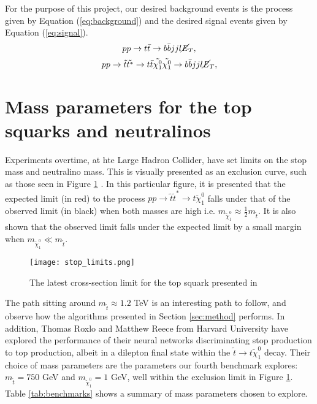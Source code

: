 For the purpose of this project, our desired background events is the process given by Equation (\ref{eq:background}) and the desired signal events given by Equation (\ref{eq:signal}). \\

\begin{equation}
 pp \rightarrow t \Bar{t} \rightarrow b\Bar{b}jjl\cancel{\it{E}}_{T},
 \label{eq:background}
\end{equation}
\begin{equation}
  pp \rightarrow \Tilde{t}\Tilde{t^*} \rightarrow t \Bar{t} \Tilde{\chi^0_1}\Tilde{\chi^0_1} \rightarrow b\Bar{b}jjl\cancel{\it{E}}_{T},
  \label{eq:signal}
\end{equation}

\section{Mass parameters for the top squarks and neutralinos}
Experiments overtime, at hte Large Hadron Collider, have set limits on the stop mass and neutralino mass. This is visually presented as an exclusion curve, such as those seen in Figure \ref{fig:limits} \cite{cms2019search}. In this particular figure, it is presented that the expected limit (in red) to the process $pp \rightarrow \tilde{t}\tilde{t}^* \rightarrow t\tilde{\chi}_1^0$ falls under that of the observed limit (in black) when both masses are high i.e. $m_{\tilde{\chi}_1^0}\approx \frac{1}{2}m_{\tilde{t}}$. It is also shown that the observed limit falls under the expected limit by a small margin when $m_{\tilde{\chi}_1^0}\ll m_{\tilde{t}}$. \\

\begin{figure}[htbp]
    \centering
    \texttt{[image: stop\_limits.png]}
    \caption{The latest cross-section limit for the top squark presented in 
    \cite{cms2019search}}
    \label{fig:limits}
\end{figure}

The path sitting around $ m_{\tilde{t}} \approx 1.2$ TeV is an interesting path to follow, and observe how the algorithms presented in Section \ref{sec:method} performs. In addition, Thomas Roxlo and Matthew Reece from Harvard University \cite{roxlo2018opening} have explored the performance of their neural networks discriminating stop production to top production, albeit in a dilepton final state within the $\tilde{t} \rightarrow t \tilde{\chi}_1^0$ decay. Their choice of mass parameters are the parameters our fourth benchmark explores: $m_{\tilde{t}} =750$ GeV and $m_{\tilde{\chi}_1^0} = 1$ GeV, well within the exclusion limit in Figure \ref{fig:limits}. Table \ref{tab:benchmarks} shows a summary of mass parameters chosen to explore. 

